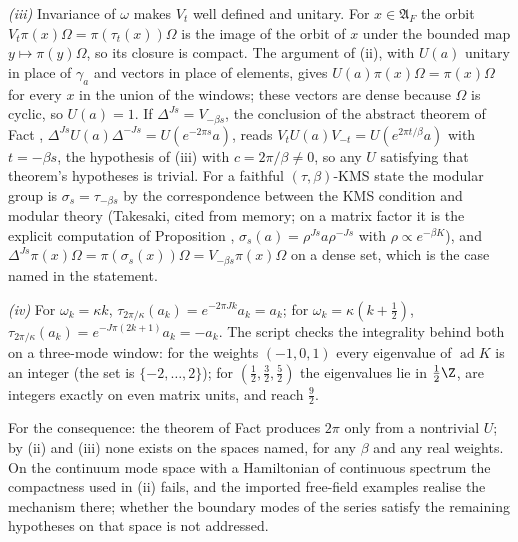 \emph{(iii)} Invariance of $\omega$ makes $V_{t}$ well defined and unitary. For $x \in \mathfrak{A}_{F}$ the orbit $V_{t}\pi(x)\Omega = \pi(\tau_{t}(x))\Omega$ is the image of the orbit of $x$ under the bounded map $y \mapsto \pi(y)\Omega$, so its closure is compact. The argument of (ii), with $U(a)$ unitary in place of $\gamma_{a}$ and vectors in place of elements, gives $U(a)\pi(x)\Omega = \pi(x)\Omega$ for every $x$ in the union of the windows; these vectors are dense because $\Omega$ is cyclic, so $U(a) = 1$. If $\Delta^{Js} = V_{-\beta s}$, the conclusion of the abstract theorem of Fact , $\Delta^{Js}U(a)\Delta^{-Js} = U(e^{-2\pi s}a)$, reads $V_{t}U(a)V_{-t} = U(e^{2\pi t/\beta}a)$ with $t = -\beta s$, the hypothesis of (iii) with $c = 2\pi/\beta \neq 0$, so any $U$ satisfying that theorem's hypotheses is trivial. For a faithful $(\tau, \beta)$-KMS state the modular group is $\sigma_{s} = \tau_{-\beta s}$ by the correspondence between the KMS condition and modular theory (Takesaki, cited from memory; on a matrix factor it is the explicit computation of Proposition , $\sigma_{s}(a) = \rho^{Js}a\rho^{-Js}$ with $\rho \propto e^{-\beta K}$), and $\Delta^{Js}\pi(x)\Omega = \pi(\sigma_{s}(x))\Omega = V_{-\beta s}\pi(x)\Omega$ on a dense set, which is the case named in the statement.

\emph{(iv)} For $\omega_{k} = \kappa k$, $\tau_{2\pi/\kappa}(a_{k}) = e^{-2\pi Jk}a_{k} = a_{k}$; for $\omega_{k} = \kappa(k + \tfrac12)$, $\tau_{2\pi/\kappa}(a_{k}) = e^{-J\pi(2k+1)}a_{k} = -a_{k}$. The script checks the integrality behind both on a three-mode window: for the weights $(-1, 0, 1)$ every eigenvalue of $\operatorname{ad}K$ is an integer (the set is $\{-2, \ldots, 2\}$); for $(\tfrac12, \tfrac32, \tfrac52)$ the eigenvalues lie in $\tfrac12\Z$, are integers exactly on even matrix units, and reach $\tfrac92$.

For the consequence: the theorem of Fact  produces $2\pi$ only from a nontrivial $U$; by (ii) and (iii) none exists on the spaces named, for any $\beta$ and any real weights. On the continuum mode space with a Hamiltonian of continuous spectrum the compactness used in (ii) fails, and the imported free-field examples realise the mechanism there; whether the boundary modes of the series satisfy the remaining hypotheses on that space is not addressed.
